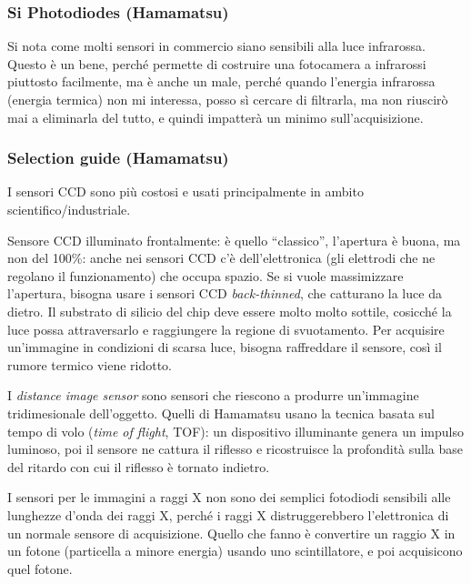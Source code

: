 \documentclass[a4paper,11pt]{article}
\begin{document}
\subsubsection{Si Photodiodes (Hamamatsu)}
Si nota come molti sensori in commercio siano sensibili alla luce infrarossa. Questo è un bene, perché permette di
costruire una fotocamera a infrarossi piuttosto facilmente, ma è anche un male, perché quando l'energia infrarossa (energia termica) non mi interessa, posso sì cercare di filtrarla, ma non
riuscirò mai a eliminarla del tutto, e quindi impatterà un minimo sull'acquisizione.

\subsubsection{Selection guide (Hamamatsu)}
I sensori CCD sono più costosi e usati principalmente in ambito scientifico/industriale.
\par
Sensore CCD illuminato frontalmente: è quello ``classico'', l'apertura è buona, ma non del 100\%: anche nei sensori CCD c'è
dell'elettronica (gli elettrodi che ne regolano il funzionamento) che occupa spazio. Se si vuole massimizzare l'apertura, bisogna usare i sensori CCD \textit{back-thinned},
che catturano la luce da dietro. Il substrato di silicio del chip deve essere molto molto sottile, cosicché la luce possa attraversarlo e raggiungere
la regione di svuotamento. Per acquisire un'immagine in condizioni di scarsa luce, bisogna raffreddare il sensore, così il rumore termico viene ridotto.
\par
I \textit{distance image sensor} sono sensori che riescono a produrre un'immagine tridimesionale dell'oggetto. Quelli di
Hamamatsu usano la tecnica basata sul tempo di volo (\textit{time of flight}, TOF): un dispositivo illuminante genera un impulso
luminoso, poi il sensore ne cattura il riflesso e ricostruisce la profondità sulla base del ritardo
con cui il riflesso è tornato indietro.
\par
I sensori per le immagini a raggi X non sono dei semplici fotodiodi sensibili alle lunghezze d'onda dei raggi X,
perché i raggi X distruggerebbero l'elettronica di un normale sensore di acquisizione. Quello che fanno
è convertire un raggio X in un fotone (particella a minore energia) usando uno scintillatore, e poi acquisicono quel fotone.
\end{document}
